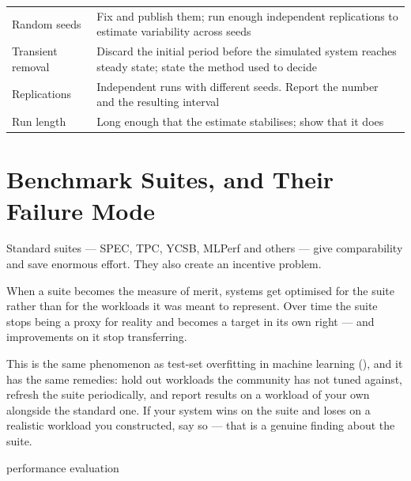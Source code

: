 \begin{center}
\small
\begin{tabular}{@{}L{3.4cm}L{10.9cm}@{}}
\toprule
Random seeds       & Fix and publish them; run enough independent replications
                     to estimate variability across seeds \\
Transient removal  & Discard the initial period before the simulated system
                     reaches steady state; state the method used to decide \\
Replications       & Independent runs with different seeds. Report the number
                     and the resulting interval \\
Run length         & Long enough that the estimate stabilises; show that it does \\
\bottomrule
\end{tabular}
\end{center}

\section{Benchmark Suites, and Their Failure Mode}

Standard suites --- SPEC, TPC, YCSB, MLPerf and others --- give comparability
and save enormous effort. They also create an incentive problem.

\begin{conceptbox}
When a suite becomes the measure of merit, systems get optimised for the suite
rather than for the workloads it was meant to represent. Over time the suite
stops being a proxy for reality and becomes a target in its own right --- and
improvements on it stop transferring.

\medskip
This is the same phenomenon as test-set overfitting in machine learning
(), and it has the same remedies: hold out workloads the
community has not tuned against, refresh the suite periodically, and report
results on a workload of your own alongside the standard one. If your system
wins on the suite and loses on a realistic workload you constructed, say so ---
that is a genuine finding about the suite.
\end{conceptbox}

\begin{traditions}{performance evaluation}
\end{traditions}

